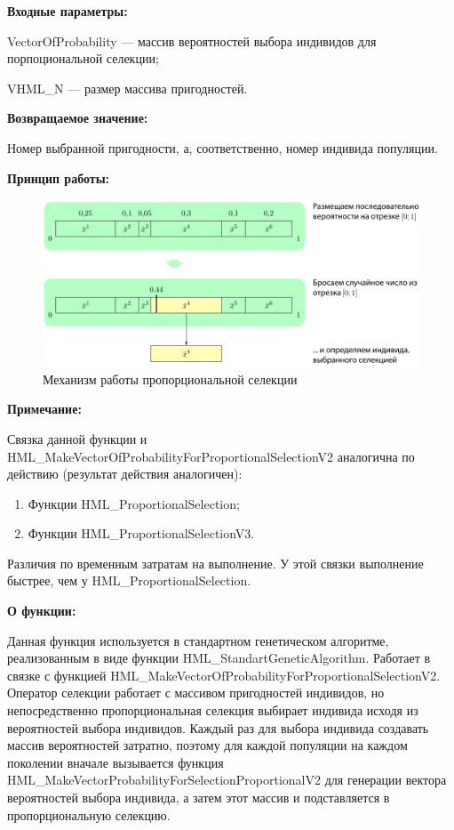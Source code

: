 \textbf{Входные параметры:}
 
 VectorOfProbability --- массив вероятностей выбора индивидов для порпоциональной селекции;
 
 VHML\_N --- размер массива пригодностей.

\textbf{Возвращаемое значение:} 

Номер выбранной пригодности, а, соответственно, номер индивида популяции.

 \textbf{Принцип работы:}

\begin{figure} [h]
  \center
  \includegraphics [scale=0.8] {HML_ProportionalSelection_Sheme}
  \caption{Механизм работы пропорциональной селекции} 
  \label{img:HML_ProportionalSelection_Sheme}  
\end{figure}

\textbf{Примечание:}

Связка данной функции и HML\_MakeVectorOfProbabilityForProportionalSelectionV2 аналогична по действию (результат действия аналогичен):
 
 \begin{enumerate}
\item Функции HML\_ProportionalSelection;
\item Функции HML\_ProportionalSelectionV3.
 \end{enumerate}
 
 Различия по временным затратам на выполнение. У этой связки выполнение быстрее, чем у HML\_ProportionalSelection.
  
\textbf{О функции:}

 Данная функция используется в стандартном генетическом алгоритме, реализованным в виде функции HML\_StandartGeneticAlgorithm. Работает в связке с функцией HML\_MakeVectorOfProbabilityForProportionalSelectionV2. Оператор селекции работает с массивом пригодностей индивидов, но непосредственно пропорциональная селекция выбирает индивида исходя из вероятностей выбора индивидов. Каждый раз для выбора индивида создавать массив вероятностей затратно, поэтому для каждой популяции на каждом поколении вначале вызывается функция HML\_MakeVectorProbabilityForSelectionProportionalV2 для генерации вектора вероятностей выбора индивида, а затем этот массив и подставляется в пропорциональную селекцию.

